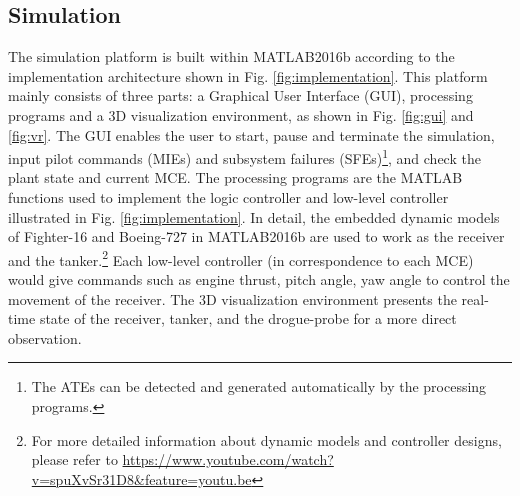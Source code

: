 \subsection{Simulation}
The simulation platform is built within MATLAB2016b according to the implementation architecture shown in Fig. \ref{fig:implementation}. This platform mainly consists of three parts: a Graphical User Interface (GUI), processing programs and a 3D visualization environment, as shown in Fig. \ref{fig:gui} and \ref{fig:vr}. The GUI enables the user to start, pause and terminate the simulation, input pilot commands (MIEs) and subsystem failures (SFEs)\footnote{The ATEs can be detected and generated automatically by the processing programs.}, and check the plant state and current MCE. The processing programs are the MATLAB functions used to implement the logic controller and low-level controller illustrated in Fig. \ref{fig:implementation}. In detail, the embedded dynamic models of Fighter-16 and Boeing-727 in MATLAB2016b are used to work as the receiver and the tanker.\footnote{For more detailed information about dynamic models and controller designs, please refer to \url{https://www.youtube.com/watch?v=spuXvSr31D8&feature=youtu.be}} Each low-level controller (in correspondence to each MCE) would give commands such as engine thrust, pitch angle, yaw angle to control the movement of the receiver. The 3D visualization environment presents the real-time state of the receiver, tanker, and the drogue-probe for a more direct observation.

